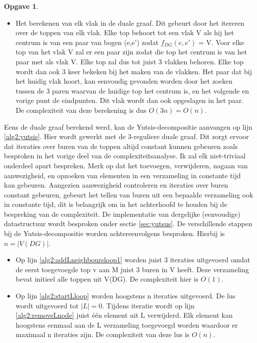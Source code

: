 \documentclass[11pt, a4paper, table]{article}
\theoremstyle{definition}
\newtheorem{opgave}{Opgave}
\theoremstyle{definition}
\theoremstyle{definition}
\begin{document}
\begin{opgave}
\begin{itemize}
	\item Het berekenen van elk vlak in de duale graaf. Dit gebeurt door het itereren over de toppen van elk vlak. Elke top behoort tot een vlak V als hij het centrum is van een paar van bogen (e,e') zodat $f_{DG}(e,e')$ = V. Voor elke top van het vlak V zal er een paar zijn zodat die top het centrum is van het paar met als vlak V. Elke top zal dus tot juist 3 vlakken behoren. Elke top wordt dan ook 3 keer bekeken bij het maken van de vlakken. Het paar dat bij het huidig vlak hoort, kan eenvoudig gevonden worden door het zoeken tussen de 3 paren waarvan de huidige top het centrum is, en het volgende en vorige punt de eindpunten. Dit vlak wordt dan ook opgeslagen in het paar. De complexiteit van deze berekening is dus $O(3n)=O(n)$.
\end{itemize}
Eens de duale graaf berekend werd, kan de Yutsis-decompositie aanvangen op lijn \ref{alg2:yutsis}. Hier wordt gewerkt met de 3-reguliere duale graaf. Dit zorgt ervoor dat iteraties over buren van de toppen altijd constant kunnen gebeuren zoals besproken in het vorige deel van de complexiteitsanalyse.
Ik zal elk niet-triviaal onderdeel apart bespreken. Merk op dat het toevoegen, verwijderen, nagaan van aanwezigheid, en opzoeken van elementen in een verzameling in constante tijd kan gebeuren. Aangezien aanwezigheid controleren en iteraties over buren constant gebeuren, gebeurt het tellen van buren uit een bepaalde verzameling ook in constante tijd, dit is belangrijk om in het achterhoofd te houden bij de bespreking van de complexiteit. De implementatie van dergelijke (eenvoudige) datastructuur wordt besproken onder sectie \ref{sec:yutsus}.
De verschillende stappen bij de Yutsis-decompositie worden achtereenvolgens besproken. Hierbij is $n=|V(DG)|$. 
\begin{itemize}
	\item Op lijn \ref{alg2:addLneighboursloop1} worden juist 3 iteraties uitgevoerd omdat de eerst toegevoegde top v aan M juist 3 buren in V heeft. Deze verzameling bevat initieel alle toppen uit V(DG). De complexiteit hier is $O(1)$.
	\item Op lijn \ref{alg2:startLloop} worden hoogstens n iteraties uitgevoerd. De lus wordt uitgevoerd tot $|L|=0$. Tijdens iteratie wordt op lijn \ref{alg2:removeLnode} juist \'{e}\'{e}n element uit L verwijderd. 
	Elk element kan hoogstens eenmaal aan de L verzameling toegevoegd worden waardoor er maximaal n iteraties zijn. De complexiteit van deze lus is $O(n)$.

\end{itemize}
\end{opgave}
\end{document}
